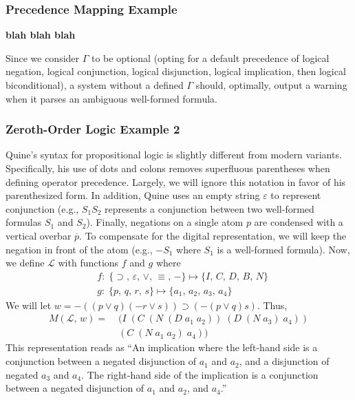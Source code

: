 \documentclass[ms]{uncgdissertationexp2}
\theoremstyle{plain}
\theoremstyle{definition}
\theoremstyle{remark}
\begin{document}
\subsubsection{Precedence Mapping Example}
\textbf{blah blah blah}

Since we consider $\Gamma$ to be optional (opting for a default precedence of logical negation, logical conjunction, logical disjunction, logical implication, then logical biconditional), a system without a defined $\Gamma$ should, optimally, output a warning when it parses an ambiguous well-formed formula.

\subsubsection{Zeroth-Order Logic Example 2}
Quine's \cite{methodsoflogic} syntax for propositional logic is slightly different from modern variants. Specifically, his use of dots and colons removes superfluous parentheses when defining operator precedence. Largely, we will ignore this notation in favor of his parenthesized form. In addition, Quine uses an empty string $\varepsilon$ to represent conjunction (e.g., $S_{1}S_{2}$ represents a conjunction between two well-formed formulas $S_{1}$ and $S_{2}$). Finally, negations on a single atom $p$ are condensed with a vertical overbar $\overline{p}$. To compensate for the digital representation, we will keep the negation in front of the atom (e.g., $-S_1$ where $S_1$ is a well-formed formula). Now, we define $\mathcal{L}$ with functions $f$ and $g$ where
\begin{align*}
	& f:\;\{\supset,\,\varepsilon,\,\lor,\,\equiv,\,-\}\mapsto \{I,\,C,\,D,\,B,\,N\} \\
	& g:\;\{p,\,q,\,r,\,s\} \mapsto \{a_{1},\,a_{2},\,a_{3},\,a_{4}\}  
\end{align*}
We will let $w = -((p\lor q)(-r\lor s)) \supset (-(p\lor q)s)$. Thus,
\begin{align*}
	M(\mathcal{L},\,w) =\;&(I\;(C\;(N\;(D\;a_1\;a_2))\;(D\;(N\;a_3)\;a_4))\\
					   	 &(C\;(N\;a_1\;a_2)\;a_4))
\end{align*}
This representation reads as ``An implication where the left-hand side is a conjunction between a negated disjunction of $a_1$ and $a_2$, and a disjunction of negated $a_3$ and $a_4$. The right-hand side of the implication is a conjunction between a negated disjunction of $a_1$ and $a_2$, and $a_4$.''
\end{document}
